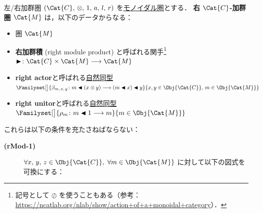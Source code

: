 \documentclass[TQFT_main]{subfiles}
\begin{document}
\begin{mydef}[label=def:modulecat,breakable]{左/右加群圏}
    $(\Cat{C},\, \otimes,\, 1,\, a,\, l,\, r)$ を\hyperref[redef:monoidal-category]{モノイダル圏}とする．
    \textbf{右 $\Cat{C}$-加群圏} $\Cat{M}$ は，以下のデータからなる：
    \begin{itemize}
        \item 圏 $\Cat{M}$
        \item \textbf{右加群積} (right module product) と呼ばれる関手\footnote{記号として $\oslash$ を使うこともある（参考：\url{https://ncatlab.org/nlab/show/action+of+a+monoidal+category}）．} $\btr \colon \Cat{C} \times \Cat{M} \lto \Cat{M}$
        \item \textbf{right actor}と呼ばれる\hyperref[def:nat]{自然同型} $\Familyset[\big]{\beta_{m,\, x,\, y} \colon m \btl (x \otimes y) \lto (m \btl x) \btl y}{x,y \in \Obj{\Cat{C}},\, m \in \Obj{\Cat{M}}}$
        \item \textbf{right unitor}と呼ばれる\hyperref[def:nat]{自然同型} $\Familyset[\big]{\rho_{m} \colon m \btl 1 \lto m}{m \in \Obj{\Cat{M}}}$
    \end{itemize}
    これらは以下の条件を充たさねばならない：
    \begin{description}
        \item[\textbf{(rMod-1)}] $\forall x,\,y,\, z \in \Obj{\Cat{C}},\; \forall m \in \Obj{\Cat{M}}$ に対して以下の図式を可換にする：
        \begin{center}
\end{center}
\end{description}
\end{mydef}
\end{document}
